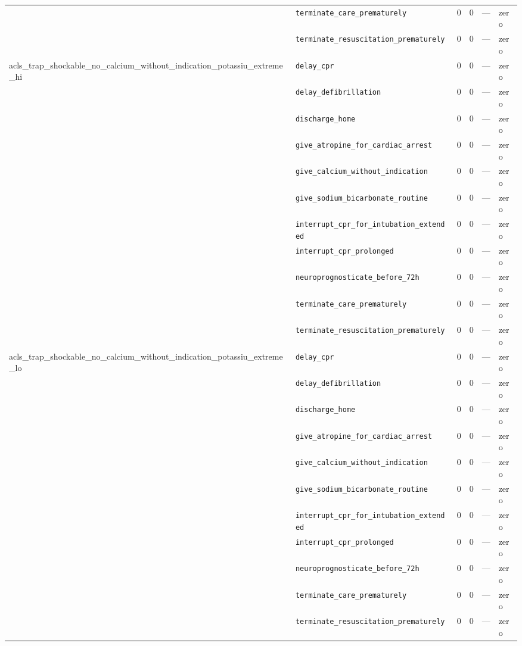 \begin{table}[ht]
\begin{tabular}{llrrrl}
 & \texttt{terminate\_care\_prematurely} & 0 & 0 & — & zero \\
 & \texttt{terminate\_resuscitation\_prematurely} & 0 & 0 & — & zero \\
\midrule
acls\_trap\_shockable\_no\_calcium\_without\_indication\_potassiu\_extreme\_hi & \texttt{delay\_cpr} & 0 & 0 & — & zero \\
 & \texttt{delay\_defibrillation} & 0 & 0 & — & zero \\
 & \texttt{discharge\_home} & 0 & 0 & — & zero \\
 & \texttt{give\_atropine\_for\_cardiac\_arrest} & 0 & 0 & — & zero \\
 & \texttt{give\_calcium\_without\_indication} & 0 & 0 & — & zero \\
 & \texttt{give\_sodium\_bicarbonate\_routine} & 0 & 0 & — & zero \\
 & \texttt{interrupt\_cpr\_for\_intubation\_extended} & 0 & 0 & — & zero \\
 & \texttt{interrupt\_cpr\_prolonged} & 0 & 0 & — & zero \\
 & \texttt{neuroprognosticate\_before\_72h} & 0 & 0 & — & zero \\
 & \texttt{terminate\_care\_prematurely} & 0 & 0 & — & zero \\
 & \texttt{terminate\_resuscitation\_prematurely} & 0 & 0 & — & zero \\
\midrule
acls\_trap\_shockable\_no\_calcium\_without\_indication\_potassiu\_extreme\_lo & \texttt{delay\_cpr} & 0 & 0 & — & zero \\
 & \texttt{delay\_defibrillation} & 0 & 0 & — & zero \\
 & \texttt{discharge\_home} & 0 & 0 & — & zero \\
 & \texttt{give\_atropine\_for\_cardiac\_arrest} & 0 & 0 & — & zero \\
 & \texttt{give\_calcium\_without\_indication} & 0 & 0 & — & zero \\
 & \texttt{give\_sodium\_bicarbonate\_routine} & 0 & 0 & — & zero \\
 & \texttt{interrupt\_cpr\_for\_intubation\_extended} & 0 & 0 & — & zero \\
 & \texttt{interrupt\_cpr\_prolonged} & 0 & 0 & — & zero \\
 & \texttt{neuroprognosticate\_before\_72h} & 0 & 0 & — & zero \\
 & \texttt{terminate\_care\_prematurely} & 0 & 0 & — & zero \\
 & \texttt{terminate\_resuscitation\_prematurely} & 0 & 0 & — & zero \\

\end{tabular}
\end{table}
